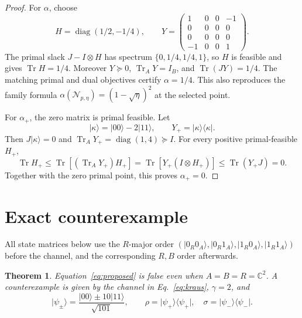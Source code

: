 \documentclass[11pt]{article}
\newtheorem{theorem}{Theorem}
\newcommand{\cN}{\mathcal N}
\newcommand{\Tr}{\operatorname{Tr}}
\newcommand{\ket}[1]{\lvert #1\rangle}
\newcommand{\bra}[1]{\langle #1\rvert}
\newcommand{\psdge}{\succeq}
\begin{document}
\begin{proof}
For $\alpha$, choose
\begin{equation}
 H=\operatorname{diag}(1/2,-1/4),\qquad
 Y=\begin{pmatrix}
 1&0&0&-1\\0&0&0&0\\0&0&0&0\\-1&0&0&1
 \end{pmatrix}.
 \label{eq:alpha-cert}
\end{equation}
The primal slack $J-I\otimes H$ has spectrum
$\{0,1/4,1/4,1\}$, so $H$ is feasible and gives $\Tr H=1/4$.
Moreover $Y\psdge0$, $\Tr_A Y=I_B$, and $\Tr(JY)=1/4$.
The matching primal and dual objectives certify $\alpha=1/4$.  This also
reproduces the family formula
$\alpha(\cN_{p,\eta})=(1-\sqrt\eta)^2$ at the selected point.

For $\alpha_+$, the zero matrix is primal feasible.  Let
\begin{equation}
 \ket{\kappa}=\ket{00}-2\ket{11},\qquad
 Y_+=\ket{\kappa}\!\bra{\kappa}.
\end{equation}
Then $J\ket{\kappa}=0$ and
$\Tr_A Y_+=\operatorname{diag}(1,4)\psdge I$.  For every positive
primal-feasible $H_+$,
\begin{equation}
 \Tr H_+
 \leq\Tr[(\Tr_A Y_+)H_+]
 =\Tr[Y_+(I\otimes H_+)]
 \leq\Tr(Y_+J)=0.
\end{equation}
Together with the zero primal point, this proves $\alpha_+=0$.
\end{proof}

\section{Exact counterexample}

All state matrices below use the $R$-major order
$(\ket{0_R0_A},\ket{0_R1_A},\ket{1_R0_A},\ket{1_R1_A})$ before the channel,
and the corresponding $R,B$ order afterwards.

\begin{theorem}
Equation~\eqref{eq:proposed} is false even when
$A=B=R=\mathbb C^2$.  A counterexample is given by the channel in
Eq.~\eqref{eq:kraus}, $\gamma=2$, and
\begin{equation}
 \ket{\psi_\pm}=\frac{\ket{00}\pm10\ket{11}}{\sqrt{101}},
 \qquad
 \rho=\ket{\psi_+}\!\bra{\psi_+},\quad
 \sigma=\ket{\psi_-}\!\bra{\psi_-}.
 \label{eq:states}
\end{equation}
\end{theorem}
\end{document}
